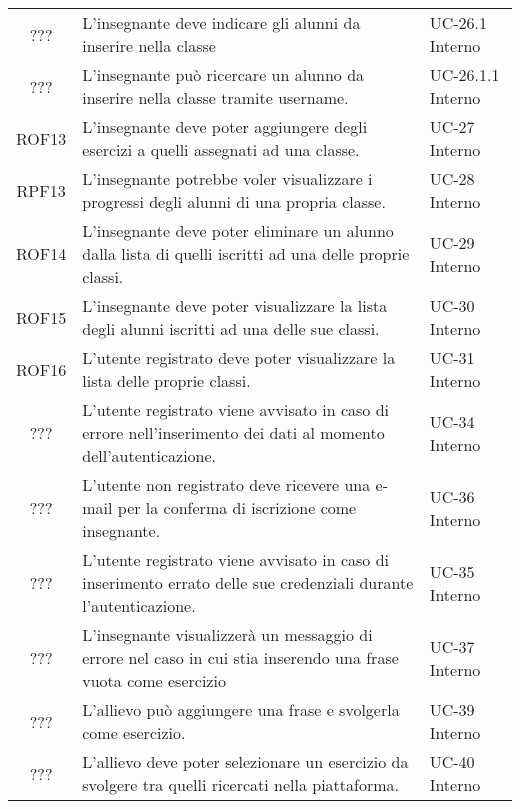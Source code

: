 \begin{tabularx}{\textwidth}{| c | p{10cm} | X |}
		??? & L'insegnante deve indicare gli alunni da inserire nella classe & UC-26.1 \newline Interno\\
		??? & L'insegnante può ricercare un alunno da inserire nella classe tramite username. & UC-26.1.1 \newline Interno\\
		ROF13 & L'insegnante deve poter aggiungere degli esercizi a quelli assegnati ad una classe. & UC-27 \newline Interno\\
		RPF13 & L'insegnante potrebbe voler visualizzare i progressi degli alunni di una propria classe. & UC-28 \newline Interno\\
		ROF14 & L'insegnante deve poter eliminare un alunno dalla lista di quelli iscritti ad una delle proprie classi. & UC-29 \newline Interno\\
		ROF15 & L'insegnante deve poter visualizzare la lista degli alunni iscritti ad una delle sue classi. & UC-30 \newline Interno\\
		ROF16 & L'utente registrato deve poter visualizzare la lista delle proprie classi. & UC-31 \newline Interno\\
		??? & L'utente registrato viene avvisato in caso di errore nell'inserimento dei dati al momento dell'autenticazione. & UC-34 \newline Interno\\
		??? & L'utente non registrato deve ricevere una e-mail per la conferma di iscrizione come insegnante. & UC-36 \newline Interno\\
		??? & L'utente registrato viene avvisato in caso di inserimento errato delle sue credenziali durante l'autenticazione. & UC-35 \newline Interno\\
		??? & L'insegnante visualizzerà un messaggio di errore nel caso in cui stia inserendo una frase vuota come esercizio & UC-37 \newline Interno\\
		??? & L'allievo può aggiungere una frase e svolgerla come esercizio. & UC-39 \newline Interno\\
		??? & L'allievo deve poter selezionare un esercizio da svolgere tra quelli ricercati nella piattaforma. & UC-40 \newline Interno\\

\end{tabularx}
